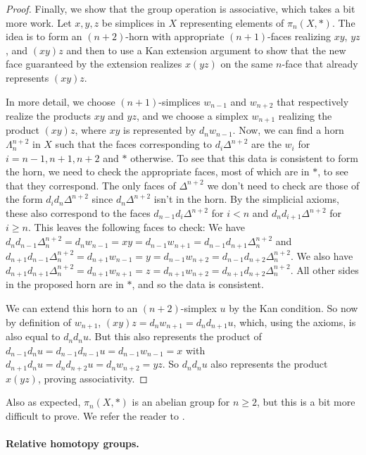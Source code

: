 \documentclass[12pt]{article}
\theoremstyle{plain}
\theoremstyle{definition}
\begin{document}
\begin{proof}
Finally, we show that the group operation is associative, which takes a bit more work. 
Let $x,y,z$ be simplices in $X$ representing elements of $\pi_n(X,*)$. The idea is to form an $(n+2)$-horn with appropriate $(n+1)$-faces realizing $xy$, $yz$, and $(xy)z$ and then to use a Kan extension argument to show that the new face guaranteed by the extension realizes $x(yz)$ on the same $n$-face that already represents $(xy)z$.

In more detail, we choose $(n+1)$-simplices $w_{n-1}$ and $w_{n+2}$ that respectively realize the products $xy$ and $yz$, and we choose a simplex $w_{n+1}$ realizing the product $(xy)z$, where $xy$ is represented by $d_nw_{n-1}$. Now, we can find a horn $\Lambda^{n+2}_n$ in $X$ such that the faces corresponding to $d_i\Delta^{n+2}$ are the $w_i$ for $i=n-1,n+1,n+2$ and $*$ otherwise. To see that this data is consistent to form the horn, we  need to check  the appropriate faces, most of which are in $*$, to see that they correspond.  The only faces of $\Delta^{n+2}$ we don't need to check are those of the form $d_id_n\Delta^{n+2}$ since $d_n\Delta^{n+2}$ isn't in the horn. By the simplicial axioms, these also correspond to the faces  $d_{n-1}d_i\Delta^{n+2}$ for  $i<n$ and $d_nd_{i+1}\Delta^{n+2}$ for $i\geq n$. This leaves the following faces to check: We have $d_nd_{n-1}\Delta^{n+2}_n=d_nw_{n-1}=xy=d_{n-1}w_{n+1}=d_{n-1}d_{n+1}\Delta^{n+2}_n$ and $d_{n+1}d_{n-1}\Delta^{n+2}_n=d_{n+1}w_{n-1}=y=d_{n-1}w_{n+2}=d_{n-1}d_{n+2}\Delta^{n+2}_n$.  We also have  $d_{n+1}d_{n+1}\Delta^{n+2}_n=d_{n+1}w_{n+1}=z=d_{n+1}w_{n+2}=d_{n+1}d_{n+2}\Delta^{n+2}_n$.  All other sides in the proposed horn are in $*$, and so the data is consistent.

We can extend this horn to an $(n+2)$-simplex $u$ by the Kan condition. So now by definition of $w_{n+1}$,  $(xy)z=d_nw_{n+1}=d_nd_{n+1}u$, which, using the axioms, is also equal to $d_nd_nu$. But this also represents the product of $d_{n-1}d_nu=d_{n-1}d_{n-1}u=d_{n-1}w_{n-1}=x$ with $d_{n+1}d_nu=d_nd_{n+2}u=d_nw_{n+2}=yz$. So $d_nd_nu$ also represents the product $x(yz)$, proving associativity. 
\end{proof}


Also as expected, $\pi_n(X,*)$ is an abelian group for  $n\geq 2$, but this is a bit more difficult to prove. We refer the reader to \cite[Proposition 4.4]{MAY67}. 




\paragraph{Relative homotopy groups.}
\end{document}
